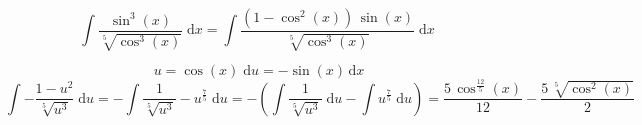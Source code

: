 \documentclass[../rgr1.tex]{subfiles}
\begin{document}
\Solution

\begin{dmath}
\int{\frac{\sin^{3}\left(x\right)}{\sqrt[{5}]{\cos^{3}\left(x\right)}}}{\;\mathrm{d}x}=
\int{\dfrac{\left(1-\cos^{2}\left(x\right)\right)\,\sin\left(x\right)}{\sqrt[{5}]{\cos^{3}\left(x\right)}}}{\;\mathrm{d}x}
\end{dmath}

$$
\;u=\cos\left(x\right)\;\mathrm{d}u=-\sin\left(x\right)\,\mathrm{d}x
$$
\begin{dmath}
	\int{-\dfrac{1-{u}^{2}}{\sqrt[{5}]{{u}^{3}}}}{\;\mathrm{d}u}=
-\int{\dfrac{1}{\sqrt[{5}]{{u}^{3}}}-{u}^{\frac{7}{5}}}{\;\mathrm{d}u}=
-\left(\int{\dfrac{1}{\sqrt[{5}]{{u}^{3}}}}{\;\mathrm{d}u}-\int{{u}^{\frac{7}{5}}}{\;\mathrm{d}u}\right)=
\dfrac{5\,\cos^{\frac{12}{5}}\left(x\right)}{12}-\dfrac{5\,\sqrt[{5}]{\cos^{2}\left(x\right)}}{2}
\end{dmath}

\end{document}
